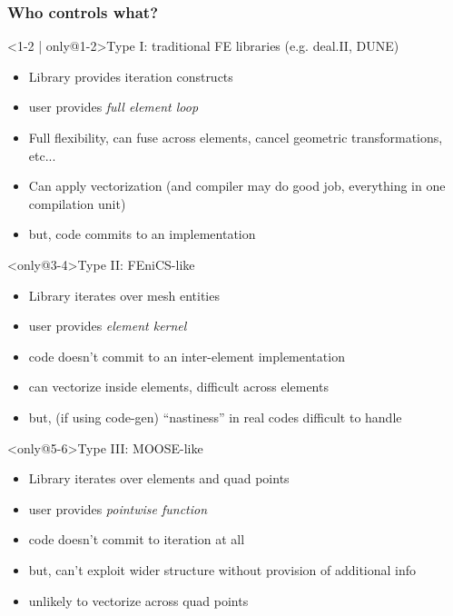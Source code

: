 \documentclass[presentation]{beamer}
\begin{document}
\begin{frame}[t]
  \frametitle{Who controls what?}
  \begin{block}<1-2 | only@1-2>{Type I: traditional FE libraries (e.g. deal.II, DUNE)}
    \begin{itemize}
    \item Library provides iteration constructs
    \item user provides \emph{full element loop}
    \end{itemize}
  \end{block}
  \begin{itemize}[<1-2 | only@2>]
  \item Full flexibility, can fuse across elements, cancel geometric
    transformations, etc...
  \item Can apply vectorization (and compiler may do good job,
    everything in one compilation unit)
  \item but, code commits to an implementation
  \end{itemize}
  \begin{block}<only@3-4>{Type II: FEniCS-like}
    \begin{itemize}
    \item Library iterates over mesh entities
    \item user provides \emph{element kernel}
    \end{itemize}
  \end{block}
  \begin{itemize}[<only@4>]
  \item code doesn't commit to an inter-element implementation
  \item can vectorize inside elements, difficult across elements
  \item but, (if using code-gen) ``nastiness'' in real codes difficult to
    handle
  \end{itemize}
  \begin{block}<only@5-6>{Type III: MOOSE-like}
    \begin{itemize}
    \item Library iterates over elements and quad points
    \item user provides \emph{pointwise function}
    \end{itemize}
  \end{block}
  \begin{itemize}[<only@6>]
  \item code doesn't commit to iteration at all
  \item but, can't exploit wider structure without provision of
    additional info
  \item unlikely to vectorize across quad points
  \end{itemize}
\end{frame}
\end{document}
